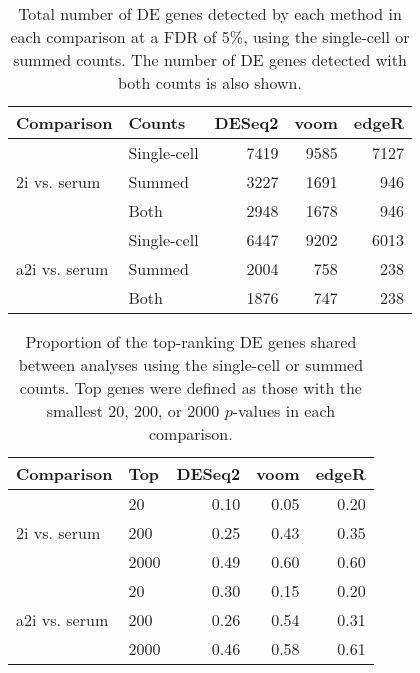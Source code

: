 \documentclass[oupdraft]{bio}
\begin{document}

\begin{table}[!p]
\caption{Total number of DE genes detected by each method in each comparison at a FDR of 5\%, using the single-cell or summed counts.
The number of DE genes detected with both counts is also shown.
}
\label{tab:realnum}
\begin{center}
\begin{tabular}{l l r r r}
\hline
\textbf{Comparison} & \textbf{Counts} & \textbf{DESeq2} & \textbf{voom} & \textbf{edgeR} \\
\hline
\multirow{3}{*}{2i vs. serum} 
& Single-cell & 7419 & 9585 & 7127 \\
& Summed & 3227 & 1691 & 946 \\
& Both & 2948 & 1678 & 946 \\
\hline
\multirow{3}{*}{a2i vs. serum} 
& Single-cell & 6447 & 9202 & 6013 \\
& Summed & 2004 & 758 & 238 \\
& Both & 1876 & 747 & 238 \\
\hline
\end{tabular}
\end{center}
\end{table}

\begin{table}[!p]
\caption{Proportion of the top-ranking DE genes shared between analyses using the single-cell or summed counts.
Top genes were defined as those with the smallest 20, 200, or 2000 $p$-values in each comparison.
}
\label{tab:realrank}
\begin{center}
\begin{tabular}{l l r r r}
\hline
\textbf{Comparison} & \textbf{Top} & \textbf{DESeq2} & \textbf{voom} & \textbf{edgeR} \\
\hline
\multirow{3}{*}{2i vs. serum} 
& 20 & 0.10 & 0.05 & 0.20 \\
& 200 & 0.25 & 0.43 & 0.35 \\
& 2000 & 0.49 & 0.60 & 0.60 \\
\hline
\multirow{3}{*}{a2i vs. serum} 
& 20 & 0.30 & 0.15 & 0.20 \\
& 200 & 0.26 & 0.54 & 0.31 \\
& 2000 & 0.46 & 0.58 & 0.61 \\
\hline
\end{tabular}
\end{center}
\end{table}
\end{document}
